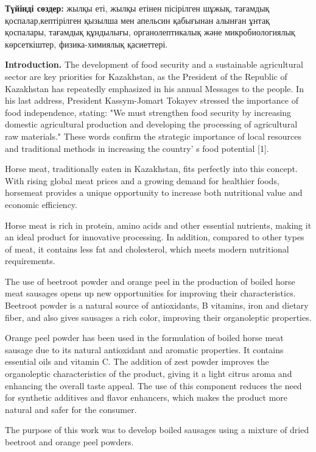 {\bfseries Түйінді сөздер:} жылқы еті, жылқы етінен пісірілген шұжық,
тағамдық қоспалар,кептірілген қызылша мен апельсин қабығынан алынған
ұнтақ қоспалары, тағамдық құндылығы, органолептикалық және
микробиологиялық көрсеткіштер, физика-химиялық қасиеттері.

\begin{multicols}{2}
{\bfseries Introduction.} The development of food security and a
sustainable agricultural sector are key priorities for Kazakhstan, as
the President of the Republic of Kazakhstan has repeatedly emphasized in
his annual Messages to the people. In his last address, President
Kassym-Jomart Tokayev stressed the importance of food independence,
stating: "We must strengthen food security by increasing domestic
agricultural production and developing the processing of agricultural
raw materials." These words confirm the strategic importance of local
resources and traditional methods in increasing the
country' s food potential {[}1{]}.

Horse meat, traditionally eaten in Kazakhstan, fits perfectly into this
concept. With rising global meat prices and a growing demand for
healthier foods, horsemeat provides a unique opportunity to increase
both nutritional value and economic efficiency.

Horse meat is rich in protein, amino acids and other essential
nutrients, making it an ideal product for innovative processing. In
addition, compared to other types of meat, it contains less fat and
cholesterol, which meets modern nutritional requirements.

The use of beetroot powder and orange peel in the production of boiled
horse meat sausages opens up new opportunities for improving their
characteristics. Beetroot powder is a natural source of antioxidants, B
vitamins, iron and dietary fiber, and also gives sausages a rich color,
improving their organoleptic properties.

Orange peel powder has been used in the formulation of boiled horse meat
sausage due to its natural antioxidant and aromatic properties. It
contains essential oils and vitamin C. The addition of zest powder
improves the organoleptic characteristics of the product, giving it a
light citrus aroma and enhancing the overall taste appeal. The use of
this component reduces the need for synthetic additives and flavor
enhancers, which makes the product more natural and safer for the
consumer.

The purpose of this work was to develop boiled sausages using a mixture
of dried beetroot and orange peel powders.


\end{multicols}
